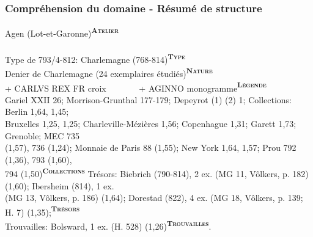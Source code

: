 \documentclass[10pt, compress]{beamer}
\newcommand{\up}[1]{\textsuperscript{\textbf{\textsc{#1}}}}
\begin{document}
\begin{frame}[fragile]
  \frametitle{Compréhension du domaine - Résumé de structure}
  \begin{scriptsize}
Agen (Lot-et-Garonne)\alert{\up{Atelier}}\\~\\
Type de 793/4-812: Charlemagne (768-814)\alert{\up{Type}}\\
Denier de Charlemagne (24 exemplaires étudiés)\alert{\up{Nature}}\\
+ CARLVS REX FR croix~~~~~~~ + AGINNO monogramme\alert{\up{Légende}}\\
Gariel XXII 26; Morrison-Grunthal 177-179; Depeyrot (1) (2) 1;
Collections: Berlin 1,64, 1,45; \\
Bruxelles 1,25, 1,25; Charleville-Mézières 1,56; Copenhague 1,31; Garett 1,73; Grenoble; MEC 735 \\
(1,57), 736 (1,24); Monnaie de Paris 88 (1,55); New York 1,64, 1,57; Prou 792 (1,36), 793 (1,60), \\
794 (1,50)\alert{\up{Collections}} Trésors: Biebrich (790-814), 2 ex. (MG 11, Vôlkers, p. 182) (1,60); Ibersheim (814), 1 ex. \\
(MG 13, Vôlkers, p. 186) (1,64); Dorestad (822), 4 ex. (MG 18, Vôlkers, p. 139; H. 7) (1,35);\alert{\up{Trésors}} \\
Trouvailles: Bolsward, 1 ex. (H. 528) (1,26)\alert{\up{Trouvailles}}.
    \end{scriptsize}
\end{frame}
\end{document}
